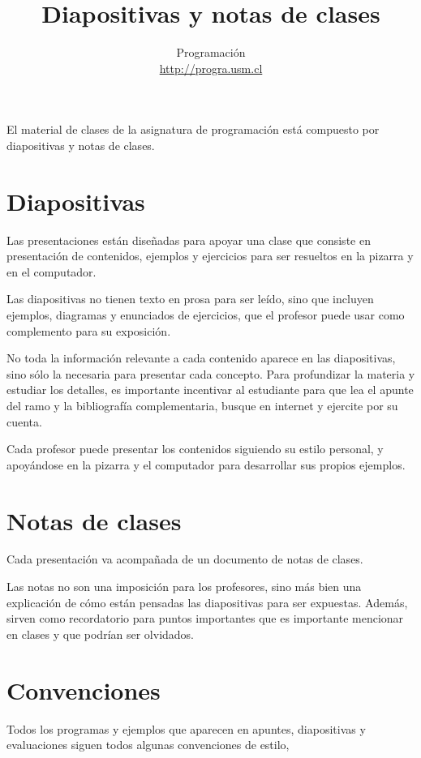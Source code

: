 \documentclass[12pt,spanish]{article}
\title{Diapositivas y notas de clases}
\author{Programación \\ \url{http://progra.usm.cl}}
\date{}
\begin{document}
  \maketitle

  El material de clases de la asignatura de programación
  está compuesto por diapositivas y notas de clases.

  \section*{Diapositivas}

  Las presentaciones están diseñadas para apoyar una clase
  que consiste en presentación de contenidos,
  ejemplos y ejercicios para ser resueltos
  en la pizarra y en el computador.

  Las diapositivas no tienen texto en prosa para ser leído,
  sino que incluyen ejemplos, diagramas y enunciados de ejercicios,
  que el profesor puede usar como complemento para su exposición.

  No toda la información relevante a cada contenido
  aparece en las diapositivas,
  sino sólo la necesaria para presentar cada concepto.
  Para profundizar la materia y estudiar los detalles,
  es importante incentivar al estudiante
  para que lea el apunte del ramo y la bibliografía complementaria,
  busque en internet y ejercite por su cuenta.

  Cada profesor puede presentar los contenidos
  siguiendo su estilo personal,
  y apoyándose en la pizarra y el computador
  para desarrollar sus propios ejemplos.

  \section*{Notas de clases}
  Cada presentación va acompañada de un documento de notas de clases.

  Las notas no son una imposición para los profesores,
  sino más bien una explicación
  de cómo están pensadas las diapositivas para ser expuestas.
  Además, sirven como recordatorio para puntos importantes
  que es importante mencionar en clases
  y que podrían ser olvidados.

  \section*{Convenciones}

  Todos los programas y ejemplos que aparecen
  en apuntes, diapositivas y evaluaciones
  siguen todos algunas convenciones de estilo,
\end{document}

